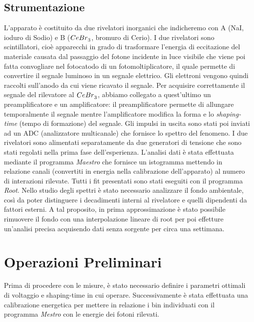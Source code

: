\documentclass[italian,11pt]{report}
\begin{document}
\section{Strumentazione}
L'apparato è costituito da due rivelatori inorganici che indicheremo con A (NaI, ioduro di Sodio) e B ($\prescript{}{}{CeBr}_{3}^{}$, bromuro di Cerio). I due rivelatori sono scintillatori, cioè apparecchi in grado di trasformare l'energia di eccitazione del materiale causata dal passaggio del fotone incidente in luce visibile che viene poi fatta convogliare nel fotocatodo di un fotomoltiplicatore, il quale permette di convertire il segnale luminoso in un segnale elettrico. Gli elettroni vengono quindi raccolti sull'anodo da cui viene ricavato il segnale. Per acquisire correttamente il segnale del rilevatore al $\prescript{}{}{CeBr}_{3}^{}$, abbiamo collegato a quest'ultimo un preamplificatore e un amplificatore: il preamplificatore permette di allungare temporalmente il segnale mentre l'amplificatore modifica la forma e lo \textit{shaping-time} (tempo di formazione) del segnale. Gli impulsi in uscita sono stati poi inviati ad un ADC (analizzatore multicanale) che fornisce lo spettro del fenomeno. I due rivelatori sono alimentati separatamente da due generatori di tensione che sono stati regolati nella prima fase dell'esperienza. L'analisi dati è stata effettuata mediante il programma \textit{Maestro} che fornisce un istogramma mettendo in relazione canali (convertiti in energia nella calibrazione dell'apparato) al numero di interazioni rilevate. Tutti i fit presentati sono stati eseguiti con il programma \textit{Root}. Nello studio degli spettri è stato necessario analizzare il fondo ambientale, così da poter distinguere i decadimenti interni al rivelatore e quelli dipendenti da fattori esterni. A tal proposito, in prima approssimazione è stato possibile rimuovere il fondo con una interpolazione lineare di root per poi effetture un'analisi precisa acquisendo dati senza sorgente per circa una settimana.

\chapter{Operazioni Preliminari}

Prima di procedere con le misure, è stato necessario definire i parametri ottimali di voltaggio e shaping-time in cui operare. Successivamente è stata effettuata una calibrazione energetica per mettere in relazione i bin individuati con il programma \textit{Mestro} con le energie dei fotoni rilevati.
\end{document}
